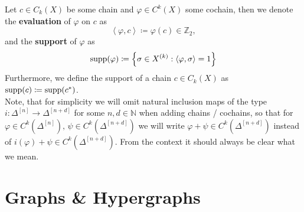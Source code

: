 Let \(c\in C_k(X)\) be some chain and \(\varphi\in C^k(X)\) some cochain, then we denote the \textbf{evaluation} of \(\varphi\) on \(c\) as
\[
\left\langle\varphi,c\right\rangle\coloneqq \varphi(c)\in\mathbb{Z}_2,
\]
and the \textbf{support} of \(\varphi\) as
\[
\mathrm{supp}(\varphi)\coloneqq \left\{\sigma\in X^{(k)}:\left\langle\varphi,\sigma\right\rangle=1\right\}
\]
Furthermore, we define the support of a chain \(c\in C_k(X)\) as \(\mathrm{supp}(c)\coloneqq \mathrm{supp}(c^*)\).\\
Note, that for simplicity we will omit natural inclusion maps of the type\\
\(i:\Delta^{[n]}\longrightarrow\Delta^{[n+d]}\) for some \(n,d\in\mathbb{N}\) when adding chains / cochains, so that for \(\varphi\in C^k(\Delta^{[n]})\text{, }\psi\in C^k(\Delta^{[n+d]})\) we will write \(\varphi+\psi\in C^k(\Delta^{[n+d]})\) instead of \(i(\varphi)+\psi\in C^k(\Delta^{[n+d]})\). From the context it should always be clear what we mean.


\section*{Graphs \& Hypergraphs}

